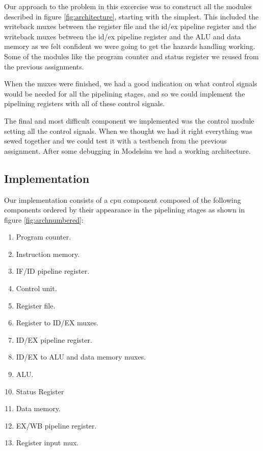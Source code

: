 \documentclass[11pt]{report}
\begin{document}
Our approach to the problem in this excercise was to construct all the 
modules described in figure \ref{fig:architecture}, starting with the simplest.  %
This included the writeback muxes between the register file and the id/ex
pipeline register and the writeback muxes between the id/ex pipeline 
register and the ALU and data memory as we felt confident we were going 
to get the hazards handling working. 
Some of the modules like the program counter and status register 
we reused from the previous assignments.

When the muxes were finished, we had a good indication on what control
signals would be needed for all the pipelining stages, and so we could 
implement the pipelining registers with all of these control signals.

The final and most difficult component we implemented was the control
module setting all the control signals. When we thought we had it right
everything was sewed together and we could test it with a testbench
from the previous assignment. After some debugging in Modelsim we had 
a working architecture.

\subsection*{Implementation}

Our implementation consists of a cpu component composed of
the following components ordered by their appearance 
in the pipelining stages as shown in figure \ref{fig:archnumbered}:
	
\begin{enumerate}
\item Program counter.
\item Instruction memory.
\item IF/ID pipeline register.
\item Control unit.
\item Register file.
\item Register to ID/EX muxes.
\item ID/EX pipeline register.
\item ID/EX to ALU and data memory muxes.
\item ALU.
\item Status Register
\item Data memory.
\item EX/WB pipeline register.
\item Register input mux.
\end{enumerate}
\end{document}
